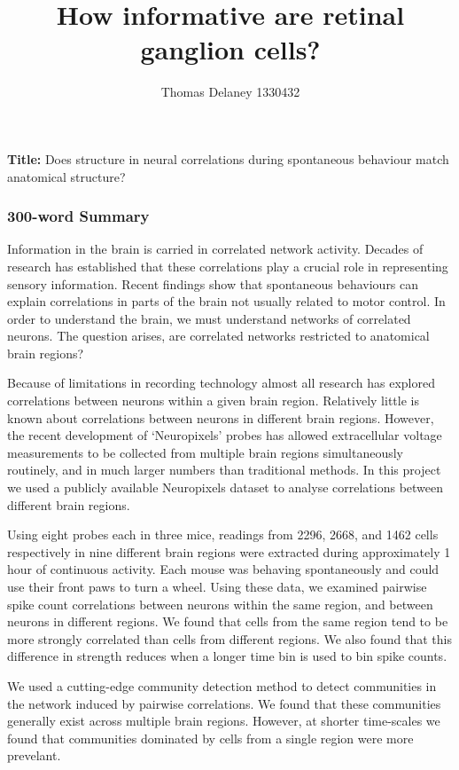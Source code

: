 \documentclass[a4paper,12pt]{article}
\title{How informative are retinal ganglion cells?}
\author{Thomas Delaney 1330432}
\theoremstyle{definition}
\begin{document}
\noindent
\textbf{Title:} Does structure in neural correlations during spontaneous behaviour match anatomical structure?
\vspace{-0.5cm}
\subsubsection*{300-word Summary}
\vspace{-0.3cm}
Information in the brain is carried in correlated network activity. Decades of research has established that these correlations play a crucial role in representing sensory information\cite{cohen1}. Recent findings show that spontaneous behaviours can explain correlations in parts of the brain not usually related to motor control\cite{stringer}. In order to understand the brain, we must understand networks of correlated neurons. The question arises, are correlated networks restricted to anatomical brain regions?

Because of limitations in recording technology almost all research has explored correlations between neurons within a given brain region. Relatively little is known about correlations between neurons in different brain regions. However, the recent development of `Neuropixels' probes\cite{jun} has allowed extracellular voltage measurements to be collected from multiple brain regions simultaneously routinely, and in much larger numbers than traditional methods. In this project we used a publicly available Neuropixels dataset to analyse correlations between different brain regions.

Using eight probes each in three mice, readings from 2296, 2668, and 1462 cells respectively in nine different brain regions were extracted during approximately 1 hour of continuous activity. Each mouse was behaving spontaneously and could use their front paws to turn a wheel\cite{stringer}. Using these data, we examined pairwise spike count correlations between neurons within the same region, and between neurons in different regions. We found that cells from the same region tend to be more strongly correlated than cells from different regions. We also found that this difference in strength reduces when a longer time bin is used to bin spike counts.

We used a cutting-edge community detection method\cite{humphries} to detect communities in the network induced by pairwise correlations. We found that these communities generally exist across multiple brain regions. However, at shorter time-scales we found that communities dominated by cells from a single region were more prevelant. 
\end{document}
